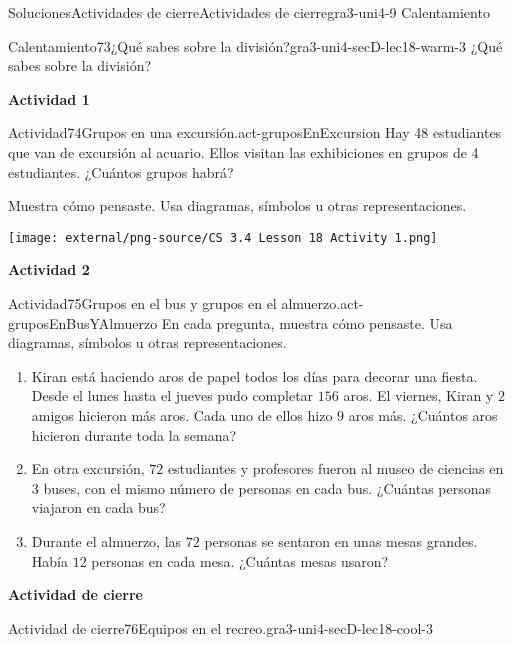 \documentclass[twoside,10pt,]{article}
\begin{document}
\begin{solutions-section}{Soluciones}{Actividades de cierre}{}{Actividades de cierre}{}{}{gra3-uni4-9}
{\space\textperiodcentered\space{}Calentamiento}
\begin{explorationsolution}{Calentamiento}{73}{¿Qué sabes sobre la división?}{gra3-uni4-secD-lec18-warm-3}%
¿Qué sabes sobre la división?%
\end{explorationsolution}%
\par\medskip
\noindent\textbf{\large{}\space\textperiodcentered\space{}Actividad 1}
\begin{activitysolution}{Actividad}{74}{Grupos en una excursión.}{act-gruposEnExcursion}%
Hay 48 estudiantes que van de excursión al acuario. Ellos visitan las exhibiciones en grupos de 4 estudiantes. ¿Cuántos grupos habrá?%
\par
Muestra cómo pensaste. Usa diagramas, símbolos u otras representaciones.%
\begin{image}{0.15}{0.7}{0.15}{}%
\texttt{[image: external/png-source/CS 3.4 Lesson 18 Activity 1.png]}
\end{image}%
\end{activitysolution}%
\par\medskip
\noindent\textbf{\large{}\space\textperiodcentered\space{}Actividad 2}
\begin{activitysolution}{Actividad}{75}{Grupos en el bus y grupos en el almuerzo.}{act-gruposEnBusYAlmuerzo}%
En cada pregunta, muestra cómo pensaste. Usa diagramas, símbolos u otras representaciones.%
%
\begin{enumerate}
\item{}Kiran está haciendo aros de papel todos los días para decorar una fiesta. Desde el lunes hasta el jueves pudo completar \(156\) aros. El viernes, Kiran y \(2\) amigos hicieron más aros. Cada uno de ellos hizo \(9\) aros más. ¿Cuántos aros hicieron durante toda la semana?%
\item{}En otra excursión, \(72\) estudiantes y profesores fueron al museo de ciencias en \(3\) buses, con el mismo número de personas en cada bus. ¿Cuántas personas viajaron en cada bus?%
\item{}Durante el almuerzo, las \(72\) personas se sentaron en unas mesas grandes. Había \(12\) personas en cada mesa. ¿Cuántas mesas usaron?%
\end{enumerate}
\end{activitysolution}%
\par\medskip
\noindent\textbf{\large{}\space\textperiodcentered\space{}Actividad de cierre}
\begin{projectsolution}{Actividad de cierre}{76}{Equipos en el recreo.}{gra3-uni4-secD-lec18-cool-3}%

\end{projectsolution}
\end{solutions-section}
\end{document}
